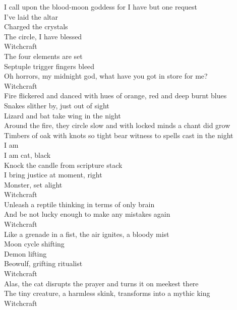 I call upon the blood-moon goddess for I have but one request \\
I've laid the altar \\
Charged the crystals \\
The circle, I have blessed \\
Witchcraft \\
The four elements are set \\
Septuple trigger fingers bleed \\
Oh horrors, my midnight god, what have you got in store for me? \\
Witchcraft \\

Fire flickered and danced with hues of orange, red and deep burnt blues \\
Snakes slither by, just out of sight \\
Lizard and bat take wing in the night \\
Around the fire, they circle slow and with locked minds a chant did grow \\
Timbers of oak with knots so tight bear witness to spells cast in the night \\

I am  \\
I am cat, black \\
Knock the candle from scripture stack \\
I bring justice at moment, right \\
 Monster, set alight \\
Witchcraft \\
Unleash a reptile thinking in terms of only  brain \\
And be not lucky enough to make any mistakes again \\
Witchcraft \\
Like a grenade in a fist, the air ignites, a bloody mist \\
Moon cycle shifting \\
Demon lifting \\
Beowulf, grifting ritualist \\
Witchcraft \\
Alas, the cat disrupts the prayer and turns it on meekest there \\
The tiny creature, a harmless skink, transforms into a mythic king \\
Witchcraft \\


